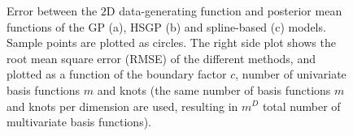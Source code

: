 \begin{figure}[h]
\hspace{1pt}
\hspace{-1.4cm} 
\caption{Error between the $2$D data-generating function and posterior mean functions of the GP (a), HSGP (b) and spline-based (c) models. Sample points are plotted as circles. The right side plot shows the root mean square error (RMSE) of the different methods, and plotted as a function of the boundary factor $c$, number of univariate basis functions $m$ and knots (the same number of basis functions $m$ and knots per dimension are used, resulting in $m^D$ total number of multivariate basis functions).}
  \label{fig13_errors_exII}
\end{figure}
